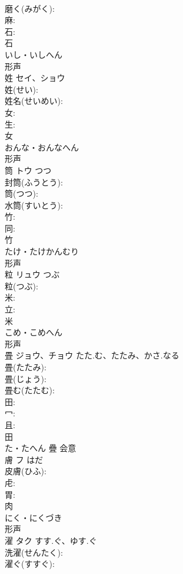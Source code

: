 \documentclass[8pt]{extreport}
\begin{document}
\begin{CJK}{UTF8}{min}
\\	磨く(みがく): 
\\	麻: 
\\	石: 
\\	石	
\\	いし・いしへん	
\\	形声 
\\	姓	セイ、ショウ			
\\	姓(せい): 
\\	姓名(せいめい): 
\\	女: 
\\	生: 
\\	女	
\\	おんな・おんなへん	
\\	形声 
\\	筒	トウ	つつ		
\\	封筒(ふうとう): 
\\	筒(つつ): 
\\	水筒(すいとう): 
\\	竹: 
\\	同: 
\\	竹	
\\	たけ・たけかんむり	
\\	形声 
\\	粒	リュウ	つぶ		
\\	粒(つぶ): 
\\	米: 
\\	立: 
\\	米	
\\	こめ・こめへん	
\\	形声 
\\	畳	ジョウ、チョウ	たた.む、たたみ、かさ.なる		
\\	畳(たたみ): 
\\	畳(じょう): 
\\	畳む(たたむ): 
\\	田: 
\\	冖: 
\\	且: 
\\	田	
\\	た・たへん	疊	会意 
\\	膚	フ	はだ		
\\	皮膚(ひふ): 
\\	虍: 
\\	胃: 
\\	肉	
\\	にく・にくづき	
\\	形声 
\\	濯	タク	すす.ぐ、ゆす.ぐ		
\\	洗濯(せんたく): 
\\	濯ぐ(すすぐ): 

\end{CJK}
\end{document}
